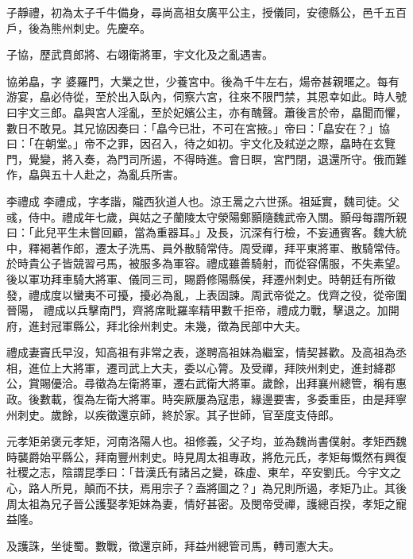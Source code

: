 \begin{pinyinscope}
 子靜禮，初為太子千牛備身，尋尚高祖女廣平公主，授儀同，安德縣公，邑千五百戶，後為熊州刺史。先慶卒。



 子協，歷武賁郎將、右翊衛將軍，宇文化及之亂遇害。



 協弟皛，字
 婆羅門，大業之世，少養宮中。後為千牛左右，煬帝甚親暱之。每有游宴，皛必侍從，至於出入臥內，伺察六宮，往來不限門禁，其恩幸如此。時人號曰宇文三郎。皛與宮人淫亂，至於妃嬪公主，亦有醜聲。蕭後言於帝，皛聞而懼，數日不敢見。其兄協因奏曰：「皛今已壯，不可在宮掖。」帝曰：「皛安在？」協曰：「在朝堂。」帝不之罪，因召入，待之如初。宇文化及弒逆之際，皛時在玄覽門，覺變，將入奏，為門司所遏，不得時進。會日瞑，宮門閉，退還所守。俄而難作，皛與五十人赴之，為亂兵所害。



 李禮成
 李禮成，字孝諧，隴西狄道人也。涼王暠之六世孫。祖延實，魏司徒。父彧，侍中。禮成年七歲，與姑之子蘭陵太守滎陽鄭顥隨魏武帝入關。顥母每謂所親曰：「此兒平生未嘗回顧，當為重器耳。」及長，沉深有行檢，不妄通賓客。魏大統中，釋褐著作郎，遷太子洗馬、員外散騎常侍。周受禪，拜平東將軍、散騎常侍。於時貴公子皆競習弓馬，被服多為軍容。禮成雖善騎射，而從容儒服，不失素望。後以軍功拜車騎大將軍、儀同三司，賜爵修陽縣侯，拜遷州刺史。時朝廷有所徵發，禮成度以蠻夷不可擾，擾必為亂，上表固諫。周武帝從之。伐齊之役，從帝圍晉陽，
 禮成以兵擊南門，齊將席毗羅率精甲數千拒帝，禮成力戰，擊退之。加開府，進封冠軍縣公，拜北徐州刺史。未幾，徵為民部中大夫。



 禮成妻竇氏早沒，知高祖有非常之表，遂聘高祖妹為繼室，情契甚歡。及高祖為丞相，進位上大將軍，遷司武上大夫，委以心膂。及受禪，拜陜州刺史，進封絳郡公，賞賜優洽。尋徵為左衛將軍，遷右武衛大將軍。歲餘，出拜襄州總管，稱有惠政。後數載，復為左衛大將軍。時突厥屢為寇患，緣邊要害，多委重臣，由是拜寧州刺史。歲餘，以疾徵還京師，終於家。其子世師，官至度支侍郎。



 元孝矩弟褒元孝矩，河南洛陽人也。祖修義，父子均，並為魏尚書僕射。孝矩西魏時襲爵始平縣公，拜南豐州刺史。時見周太祖專政，將危元氏，孝矩每慨然有興復社稷之志，陰謂昆季曰：「昔漢氏有諸呂之變，硃虛、東牟，卒安劉氏。今宇文之心，路人所見，顛而不扶，焉用宗子？盍將圖之？」為兄則所遏，孝矩乃止。其後周太祖為兄子晉公護娶孝矩妹為妻，情好甚密。及閔帝受禪，護總百揆，孝矩之寵益隆。



 及護誅，坐徙蜀。數戰，徵還京師，拜益州總管司馬，轉司憲大夫。




\end{pinyinscope}
